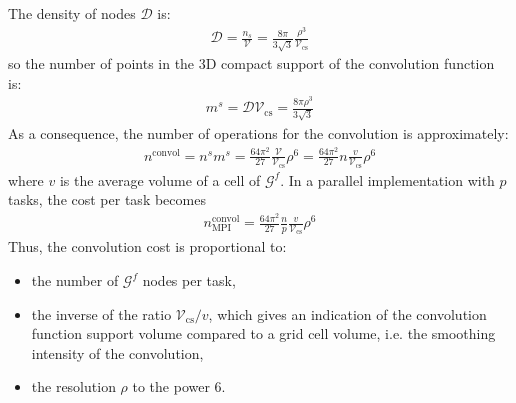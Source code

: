 \documentclass[12pt]{scrartcl}
\begin{document}
The density of nodes $\mathcal{D}$ is:
\begin{align}
\mathcal{D} = \frac{n_s}{\mathcal{V}} = \frac{8\pi}{3\sqrt{3}} \frac{\rho^3}{\mathcal{V}_\mathrm{cs}} 
\end{align}
so the number of points in the 3D compact support of the convolution function is:
\begin{align}
m^s = \mathcal{D} \mathcal{V}_\mathrm{cs} = \frac{8\pi \rho^3}{3\sqrt{3}} 
\end{align}
As a consequence, the number of operations for the convolution is approximately:
\begin{align}
n^\mathrm{convol} = n^s m^s = \frac{64\pi^2}{27} \frac{\mathcal{V}}{\mathcal{V}_\mathrm{cs}} \rho^6 = \frac{64\pi^2}{27} n \frac{v}{\mathcal{V}_\mathrm{cs}} \rho^6
\end{align}
where $v$ is the average volume of a cell of $\mathcal{G}^f$. In a parallel implementation with $p$ tasks, the cost per task becomes
\begin{align}
n^\mathrm{convol}_\mathrm{MPI} = \frac{64\pi^2}{27} \frac{n}{p} \frac{v}{\mathcal{V}_\mathrm{cs}} \rho^6
\end{align}
Thus, the convolution cost is proportional to:
\begin{itemize}
\item the number of $\mathcal{G}^f$ nodes per task,
\item the inverse of the ratio $\mathcal{V}_\mathrm{cs}/v$, which gives an indication of the convolution function support volume compared to a grid cell volume, i.e. the smoothing intensity of the convolution,
\item the resolution $\rho$ to the power 6.
\end{itemize}
\end{document}
